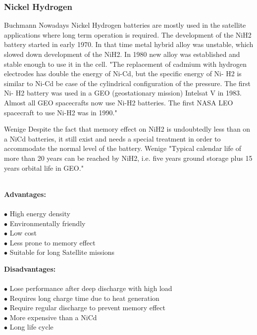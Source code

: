 \subsubsection{Nickel Hydrogen \label{sec:tech}}
Buchmann\cite{7} Nowadays Nickel Hydrogen batteries are mostly used in the satellite applications where long term operation is required. The development of the NiH2 battery started in early 1970. In that time metal hybrid alloy was unstable, which slowed down development of the NiH2. In 1980 new alloy was established and stable enough to use it in the cell. 
\cite{10}"The replacement of cadmium with hydrogen electrodes has double the energy of Ni-Cd, but the specific energy of Ni- H2 is similar to Ni-Cd be case of the cylindrical configuration of the pressure. The first Ni- H2 battery was used in a GEO (geostationary mission) Intelsat V in 1983.  Almost all GEO spacecrafts now use Ni-H2 batteries. The first NASA LEO spacecraft to use Ni-H2 was in 1990."


Wenige\cite{8} Despite the fact that memory effect on NiH2 is undoubtedly less than on a NiCd batteries, it still exist and needs a special treatment in order to accommodate the normal level of the battery. Wenige\cite{8} "Typical calendar life of more than 20 years can be reached by NiH2, i.e. five years ground storage plus 15  years  orbital  life  in  GEO." \\ \\


\begin{multicols}{2}
	
	\textbf{Advantages:} \\ \\
	$\bullet$ High energy density\\
	$\bullet$ Environmentally friendly\\
	$\bullet$ Low cost\\
	$\bullet$ Less prone to memory effect\\
	$\bullet$ Suitable for long Satellite missions\\
	

	
	
	\columnbreak
	
	\textbf{Disadvantages:} \\ \\
	$\bullet$ Lose performance after deep discharge with high load\\
	$\bullet$ Requires long charge time due to heat generation\\
	$\bullet$ Require regular discharge to prevent memory effect\\ 
	$\bullet$ More expensive than a NiCd\\
	$\bullet$ Long life cycle

	
\end{multicols}

